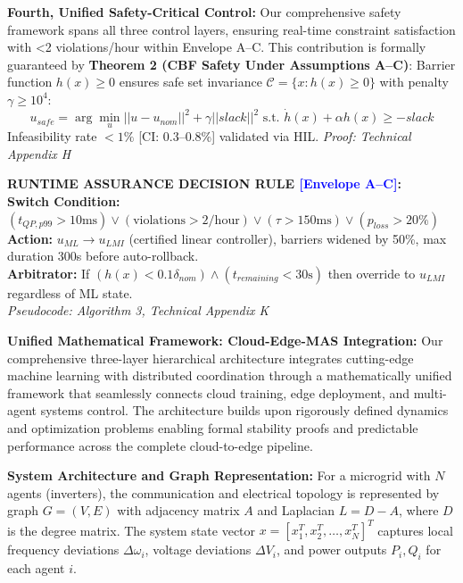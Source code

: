 \documentclass[12pt]{article}
\begin{document}
\textbf{Fourth, Unified Safety-Critical Control:} Our comprehensive safety framework spans all three control layers, ensuring real-time constraint satisfaction with <2 violations/hour within Envelope A--C. This contribution is formally guaranteed by \textbf{Theorem 2 (CBF Safety Under Assumptions A--C)}: Barrier function $h(x)\geq0$ ensures safe set invariance $\mathcal{C}=\{x:h(x)\geq0\}$ with penalty $\gamma\geq10^4$:
$$u_{safe} = \arg\min_u ||u - u_{nom}||^2 + \gamma||slack||^2 \text{ s.t. } \dot{h}(x) + \alpha h(x) \geq -slack$$
Infeasibility rate $<1\%$ [CI: 0.3--0.8\%] validated via HIL. \textit{Proof: Technical Appendix H}

\begin{center}
\colorbox{red!20}{\begin{minipage}{0.95\textwidth}
\textbf{RUNTIME ASSURANCE DECISION RULE \textcolor{blue}{[Envelope A--C]}:} \\
\textbf{Switch Condition:} $(t_{QP,p99} > 10\text{ms}) \vee (\text{violations} > 2/\text{hour}) \vee (\tau > 150\text{ms}) \vee (p_{loss} > 20\%)$ \\
\textbf{Action:} $u_{ML} \rightarrow u_{LMI}$ (certified linear controller), barriers widened by 50\%, max duration 300s before auto-rollback. \\
\textbf{Arbitrator:} If $(h(x) < 0.1\delta_{nom}) \wedge (t_{remaining} < 30\text{s})$ then override to $u_{LMI}$ regardless of ML state. \\
\textit{Pseudocode: Algorithm 3, Technical Appendix K}
\end{minipage}}
\end{center}

\textbf{Unified Mathematical Framework: Cloud-Edge-MAS Integration:} Our comprehensive three-layer hierarchical architecture integrates cutting-edge machine learning with distributed coordination through a mathematically unified framework that seamlessly connects cloud training, edge deployment, and multi-agent systems control. The architecture builds upon rigorously defined dynamics and optimization problems enabling formal stability proofs and predictable performance across the complete cloud-to-edge pipeline.

\textbf{System Architecture and Graph Representation:} For a microgrid with $N$ agents (inverters), the communication and electrical topology is represented by graph $G = (V, E)$ with adjacency matrix $A$ and Laplacian $L = D - A$, where $D$ is the degree matrix. The system state vector $x = [x_1^T, x_2^T, \ldots, x_N^T]^T$ captures local frequency deviations $\Delta\omega_i$, voltage deviations $\Delta V_i$, and power outputs $P_i, Q_i$ for each agent $i$.
\end{document}

